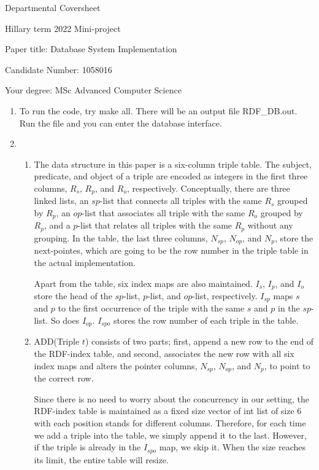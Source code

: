 \documentclass{article}
\begin{document}
Departmental Coversheet

Hillary term 2022
Mini-project

Paper title: Database System Implementation

Candidate Number: 1058016

Your degree: MSc Advanced Computer Science

\newpage

\begin{enumerate}
	\item[] To run the code, try make all. There will be an output file RDF\_DB.out. Run the file and you can enter the database interface.  
	\item 
	\begin{enumerate}
	\item 
	The data structure in this paper is a six-column triple table. The subject, predicate, and object of a triple are encoded as integers in the first three columns, $R_s$, $R_p$, and $R_o$, respectively. Conceptually, there are three linked lists, an $sp$-list that connects all triples with the same $R_s$ grouped by $R_p$, an $op$-list that associates all triple with the same $R_o$ grouped by $R_p$, and a $p$-list that relates all triples with the same $R_p$ without any grouping. In the table, the last three columns, $N_{sp}$, $N_{op}$, and $N_p$, store the next-pointes, which are going to be the row number in the triple table in the actual implementation.
	
	Apart from the table, six index maps are also maintained. $I_s$, $I_p$, and $I_o$ store the head of the $sp$-list, $p$-list, and $op$-list, respectively. $I_{sp}$ maps $s$ and $p$ to the first occurrence of the triple with the same $s$ and $p$ in the $sp$-list. So does $I_{op}$. $I_{spo}$ stores the row number of each triple in the table. 
	
	\item {\large A}DD(Triple $t$) consists of two parts; first, append a new row to the end of the RDF-index table, and second, associates the new row with all six index maps and alters the pointer columns, $N_{sp}$, $N_{op}$, and $N_p$, to point to the correct row.
	
	Since there is no need to worry about the concurrency in our setting, the RDF-index table is maintained as a fixed size vector of int list of size 6 with each position stands for different columns. Therefore, for each time we add a triple into the table, we simply append it to the last. However, if the triple is already in the $I_{spo}$ map, we skip it. When the size reaches its limit, the entire table will resize. 


\end{enumerate}
\end{enumerate}
\end{document}
